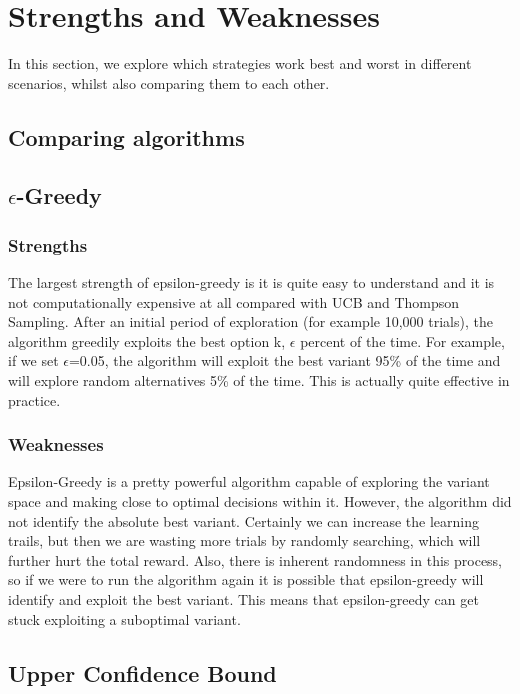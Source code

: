 \section{Strengths and Weaknesses}
In this section, we explore which strategies work best and worst in different scenarios, whilst also comparing them to each other.

\subsection{Comparing algorithms}

\subsection{$\epsilon$-Greedy}

\subsubsection{Strengths}
The largest strength of epsilon-greedy is it is quite easy to understand and it is not computationally expensive at all compared with UCB and Thompson Sampling. After an initial period of exploration (for example 10,000 trials), the algorithm greedily exploits the best option k, $\epsilon$ percent of the time. For example, if we set $\epsilon$=0.05, the algorithm will exploit the best variant 95\% of the time and will explore random alternatives 5\% of the time. This is actually quite effective in practice.

\subsubsection{Weaknesses}
Epsilon-Greedy is a pretty powerful algorithm capable of exploring the variant space and making close to optimal decisions within it. However, the algorithm did not identify the absolute best variant. Certainly we can increase the learning trails, but then we are wasting more trials by randomly searching, which will further hurt the total reward. Also, there is inherent randomness in this process, so if we were to run the algorithm again it is possible that epsilon-greedy will identify and exploit the best variant. This means that epsilon-greedy can get stuck exploiting a suboptimal variant.

\subsection{Upper Confidence Bound}

